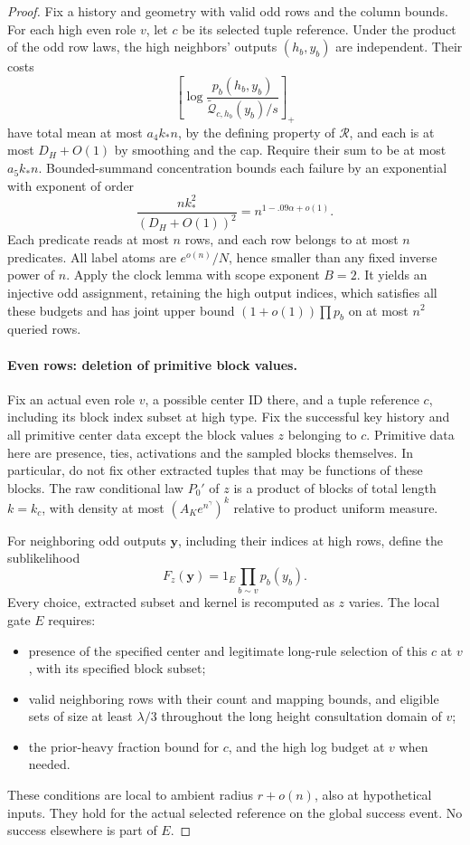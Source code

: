 \begin{proof}
Fix a history and geometry with valid odd rows and the column bounds.
For each high even role \(v\), let \(c\) be its selected tuple reference.
Under the product of the odd row laws, the high neighbors' outputs
\((h_b,y_b)\) are independent. Their costs
\[
 \left[\log\frac{p_b(h_b,y_b)}
              {\widetilde{\mathcal Q}_{c,h_b}(y_b)/s}\right]_+
\]
have total mean at most \(a_4k_*n\), by the defining property of
\(\mathcal R\), and each is at most \(D_H+O(1)\) by smoothing and
the cap. Require their sum to be at most \(a_5k_*n\). Bounded-summand
concentration bounds each failure by an exponential with exponent of
order
\[
 \frac{nk_*^2}{(D_H+O(1))^2}=n^{1-.09\alpha+o(1)}.
\]
Each predicate reads at most \(n\) rows, and each row belongs to at most
\(n\) predicates. All label atoms are \(e^{o(n)}/N\), hence smaller
than any fixed inverse power of \(n\). Apply the clock lemma with
scope exponent \(B=2\). It yields an injective odd assignment, retaining
the high output indices, which satisfies all these budgets and has joint
upper bound \((1+o(1))\prod p_b\) on at most \(n^2\) queried rows.

\paragraph{Even rows: deletion of primitive block values.}
Fix an actual even role \(v\), a possible center ID there, and a tuple
reference \(c\), including its block index subset at high type. Fix the
successful key history and all primitive center data except the block
values \(z\) belonging to \(c\). Primitive data here are presence,
ties, activations and the sampled blocks themselves. In particular, do
not fix other extracted tuples that may be functions of these blocks.
The raw conditional law \(P_0'\) of \(z\) is a product of blocks of
total length \(k=k_c\), with density at most
\((A_Ke^{n^\gamma})^k\) relative to product uniform measure.

For neighboring odd outputs \(\mathbf y\), including their indices
at high rows, define the sublikelihood
\[
 F_z(\mathbf y)=1_E\prod_{b\sim v}p_b(y_b).
\]
Every choice, extracted subset and kernel is recomputed as \(z\) varies.
The local gate \(E\) requires:
\begin{itemize}
\item presence of the specified center and legitimate long-rule selection
of this \(c\) at \(v\), with its specified block subset;
\item valid neighboring rows with their count and mapping bounds, and
eligible sets of size at least \(\lambda/3\) throughout the long height
consultation domain of \(v\);
\item the prior-heavy fraction bound for \(c\), and the high log budget
at \(v\) when needed.
\end{itemize}
These conditions are local to ambient radius \(r+o(n)\), also at
hypothetical inputs. They hold for the actual selected reference on the
global success event. No success elsewhere is part of \(E\).


\end{proof}
